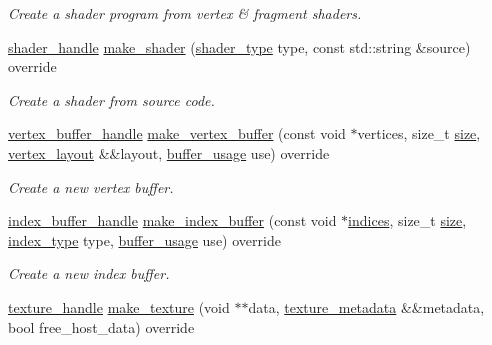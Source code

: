 \begin{DoxyCompactItemize}
\begin{DoxyCompactList}\small\item\em Create a shader program from vertex \& fragment shaders. \end{DoxyCompactList}\item 
\mbox{\hyperlink{structmoka_1_1shader__handle}{shader\+\_\+handle}} \mbox{\hyperlink{classmoka_1_1gl__graphics__api_a78138ccaae9fe06ea4672dc14a978ed7}{make\+\_\+shader}} (\mbox{\hyperlink{namespacemoka_a472008f32e5db526d38eace7d3e45772}{shader\+\_\+type}} type, const std\+::string \&source) override
\begin{DoxyCompactList}\small\item\em Create a shader from source code. \end{DoxyCompactList}\item 
\mbox{\hyperlink{structmoka_1_1vertex__buffer__handle}{vertex\+\_\+buffer\+\_\+handle}} \mbox{\hyperlink{classmoka_1_1gl__graphics__api_a4c7a5a462fa6590dcf27b9f48e4e53ab}{make\+\_\+vertex\+\_\+buffer}} (const void $\ast$vertices, size\+\_\+t \mbox{\hyperlink{namespacemoka_a4f125ee95d9889b23c3259d1fba4c2e4}{size}}, \mbox{\hyperlink{classmoka_1_1vertex__layout}{vertex\+\_\+layout}} \&\&layout, \mbox{\hyperlink{namespacemoka_a4799e695da8b173f75809387af8abed7}{buffer\+\_\+usage}} use) override
\begin{DoxyCompactList}\small\item\em Create a new vertex buffer. \end{DoxyCompactList}\item 
\mbox{\hyperlink{structmoka_1_1index__buffer__handle}{index\+\_\+buffer\+\_\+handle}} \mbox{\hyperlink{classmoka_1_1gl__graphics__api_a553669863538cbfab92a98f0f38c0040}{make\+\_\+index\+\_\+buffer}} (const void $\ast$\mbox{\hyperlink{namespacemoka_a16a7bd7fc66f698dfcaf9bca1312a2bbaa51a528f35c02157e603a20c8796a684}{indices}}, size\+\_\+t \mbox{\hyperlink{namespacemoka_a4f125ee95d9889b23c3259d1fba4c2e4}{size}}, \mbox{\hyperlink{namespacemoka_a32244b0de63481283738e2db11639e3f}{index\+\_\+type}} type, \mbox{\hyperlink{namespacemoka_a4799e695da8b173f75809387af8abed7}{buffer\+\_\+usage}} use) override
\begin{DoxyCompactList}\small\item\em Create a new index buffer. \end{DoxyCompactList}\item 
\mbox{\hyperlink{structmoka_1_1texture__handle}{texture\+\_\+handle}} \mbox{\hyperlink{classmoka_1_1gl__graphics__api_aeb20d721d419ee141f0dc64669f2d973}{make\+\_\+texture}} (void $\ast$$\ast$data, \mbox{\hyperlink{structmoka_1_1texture__metadata}{texture\+\_\+metadata}} \&\&metadata, bool free\+\_\+host\+\_\+data) override
$$
\end{DoxyCompactItemize}
